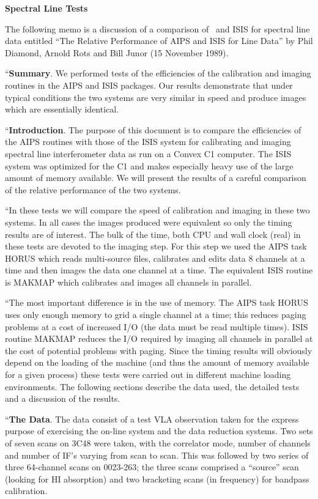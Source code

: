 \medskip
\centerline{\bf{Spectral Line Tests}}

   The following memo is a discussion of a comparison of \AIPS\ and ISIS
for spectral line data entitled ``The Relative Performance of AIPS and
ISIS for Line Data'' by  Phil Diamond, Arnold Rots and Bill Junor (15
November 1989).

{\narrower
``{\bf Summary}. We performed tests of the efficiencies of the calibration
and imaging routines in the AIPS and ISIS packages. Our results demonstrate
that under typical conditions the two systems are very similar in
speed and produce images which are essentially identical.

``{\bf Introduction}.  The purpose of this document is to compare
 the efficiencies of the
AIPS routines with those of the ISIS system for calibrating and
imaging spectral line interferometer data as run on a Convex C1
computer.  The ISIS system was optimized for the C1 and makes
especially heavy use of the large amount of memory available.  We will
present the results of a careful comparison of the relative
performance of the two systems.

   ``In these tests we will compare the speed of calibration and
imaging in these two systems.  In all cases the images produced were
equivalent so only the timing results are of interest.  The bulk of
the time, both CPU and wall clock (real) in these tests are devoted to
the imaging step.  For this step we used the AIPS task HORUS which
reads multi-source files, calibrates and edits data 8 channels at a
time and then images the data one channel at a time.  The equivalent
ISIS routine is MAKMAP which calibrates and images all channels in
parallel.

   ``The most important difference is in the use of memory.  The
AIPS task HORUS uses only enough memory to grid a single channel at a
time; this reduces paging problems at a cost of increased I/O (the
data must be read multiple times).  ISIS routine MAKMAP reduces the
I/O required by imaging all channels in parallel at the cost of
potential problems with paging.  Since the timing results will
obviously depend on the loading of the machine (and thus the amount of
memory available for a given process) these tests were carried out in
different machine loading environments.  The following sections
describe the data used, the detailed tests and a discussion of the
results.

``{\bf The Data}. The data consist of a test VLA observation taken for
the express purpose of exercising the on-line system and the data reduction
systems. Two sets of seven scans on 3C48 were taken, with the correlator
mode, number of channels and number of IF's varying from scan to scan.
This was followed by two
series of three 64-channel scans on 0023-263; the three scans
comprised a ``source'' scan (looking for HI absorption) and two
bracketing scans (in frequency) for bandpass calibration.

}
